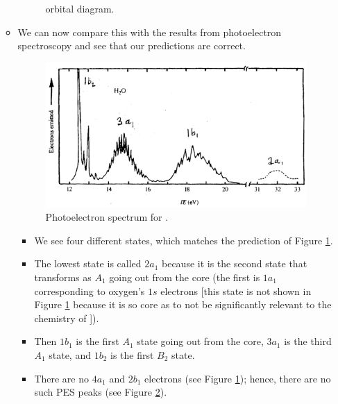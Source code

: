 \documentclass[../notes.tex]{subfiles}
\begin{document}
\begin{itemize}
\begin{itemize}
\begin{figure}[H]
            \caption{ orbital diagram.}
            \label{fig:orbitalDiagram-H2O}
        \end{figure}
        \item We can now compare this with the results from photoelectron spectroscopy and see that our predictions are correct.
        \begin{figure}[h!]
            \centering
            \includegraphics[width=0.6\linewidth]{../ExtFiles/PES-H2O.png}
            \caption{Photoelectron spectrum for .}
            \label{fig:PES-H2O}
        \end{figure}
        \begin{itemize}
            \item We see four different states, which matches the prediction of Figure \ref{fig:orbitalDiagram-H2O}.
            \item The lowest state is called $2a_1$ because it is the second state that transforms as $A_1$ going out from the core (the first is $1a_1$ corresponding to oxygen's $1s$ electrons [this state is not shown in Figure \ref{fig:orbitalDiagram-H2O} because it is so core as to not be significantly relevant to the chemistry of ]).
            \item Then $1b_1$ is the first $A_1$ state going out from the core, $3a_1$ is the third $A_1$ state, and $1b_2$ is the first $B_2$ state.
            \item There are no $4a_1$ and $2b_1$ electrons (see Figure \ref{fig:orbitalDiagram-H2O}); hence, there are no such PES peaks (see Figure \ref{fig:PES-H2O}).

\end{itemize}
\end{itemize}
\end{itemize}
\end{document}
